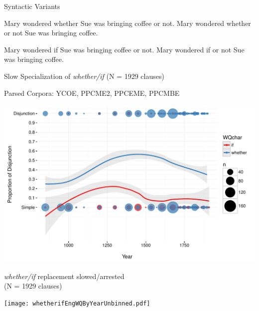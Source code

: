 \documentclass[hyperref={pdfpagelabels=false}]{beamer}
\begin{document}
\begin{frame}{Syntactic Variants}
\begin{exe}
	\ex \begin{xlist}
		\ex Mary wondered whether Sue was bringing coffee or not.
		\ex Mary wondered whether or not Sue was bringing coffee.
	\end{xlist}
	
	\ex \begin{xlist}
		\ex Mary wondered if Sue was bringing coffee or not.
		\ex * Mary wondered if or not Sue was bringing coffee.
	\end{xlist}
\end{exe}
\end{frame}

\begin{frame}{Slow Specialization of \textsl{whether/if} (N = 1929 clauses)} 


\begin{center}
 \small{Parsed Corpora: YCOE, PPCME2, PPCEME, PPCMBE \nocite{ycoe,ppcme2,ppceme,ppcmbe}}

\includegraphics[width=1.1\textwidth]{whetherifEngDisjByYear.pdf}

\end{center}
\end{frame}

\begin{frame}{\textsl{whether/if} replacement slowed/arrested\\\small{(N = 1929 clauses)}}



\texttt{[image: whetherifEngWQByYearUnbinned.pdf]}

\end{frame}
\end{document}
